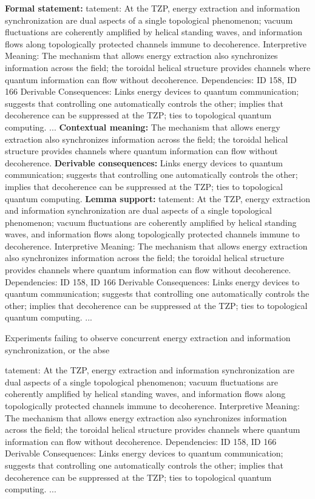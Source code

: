 \begingroup\footnotesize\setlength{\emergencystretch}{3em}\sloppy
\textbf{Formal statement:} tatement: At the TZP, energy extraction and information synchronization are dual aspects of a single topological phenomenon; vacuum fluctuations are coherently amplified by helical standing waves, and information flows along topologically protected channels immune to decoherence.   Interpretive Meaning: The mechanism that allows energy extraction also synchronizes information across the field; the toroidal helical structure provides channels where quantum information can flow without decoherence.   Dependencies: ID 158, ID 166   Derivable Consequences: Links energy devices to quantum communication; suggests that controlling one automatically controls the other; implies that decoherence can be suppressed at the TZP; ties to topological quantum computing. ...
\textbf{Contextual meaning:} The mechanism that allows energy extraction also synchronizes information across the field; the toroidal helical structure provides channels where quantum information can flow without decoherence.  
\textbf{Derivable consequences:} Links energy devices to quantum communication; suggests that controlling one automatically controls the other; implies that decoherence can be suppressed at the TZP; ties to topological quantum computing.  
\textbf{Lemma support:} tatement: At the TZP, energy extraction and information synchronization are dual aspects of a single topological phenomenon; vacuum fluctuations are coherently amplified by helical standing waves, and information flows along topologically protected channels immune to decoherence.   Interpretive Meaning: The mechanism that allows energy extraction also synchronizes information across the field; the toroidal helical structure provides channels where quantum information can flow without decoherence.   Dependencies: ID 158, ID 166   Derivable Consequences: Links energy devices to quantum communication; suggests that controlling one automatically controls the other; implies that decoherence can be suppressed at the TZP; ties to topological quantum computing. ...\par
\endgroup

Experiments failing to observe concurrent energy extraction and information synchronization, or the abse

tatement: At the TZP, energy extraction and information synchronization are dual aspects of a single topological phenomenon; vacuum fluctuations are coherently amplified by helical standing waves, and information flows along topologically protected channels immune to decoherence.   Interpretive Meaning: The mechanism that allows energy extraction also synchronizes information across the field; the toroidal helical structure provides channels where quantum information can flow without decoherence.   Dependencies: ID 158, ID 166   Derivable Consequences: Links energy devices to quantum communication; suggests that controlling one automatically controls the other; implies that decoherence can be suppressed at the TZP; ties to topological quantum computing. ...

